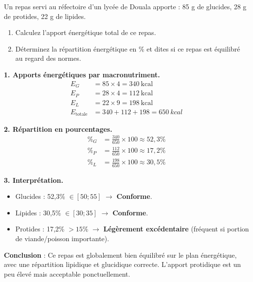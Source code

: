 \documentclass[11pt]{article}
\begin{document}
\begin{exoresolu}
Un repas servi au réfectoire d'un lycée de Douala apporte : 85 g de glucides, 28 g de protides, 22 g de lipides.
\begin{enumerate}
\item Calculez l'apport énergétique total de ce repas.
\item Déterminez la répartition énergétique en \% et dites si ce repas est équilibré au regard des normes.
\end{enumerate}
\tcblower
\textbf{1. Apports énergétiques par macronutriment.}
\begin{align*}
E_G &= 85 \times 4 = 340\ \mathrm{kcal} \\
E_P &= 28 \times 4 = 112\ \mathrm{kcal} \\
E_L &= 22 \times 9 = 198\ \mathrm{kcal} \\
E_{\text{totale}} &= 340 + 112 + 198 = \SI{650}{kcal}
\end{align*}

\textbf{2. Répartition en pourcentages.}
\begin{align*}
\%_G &= \frac{340}{650} \times 100 \approx 52,3\% \\
\%_P &= \frac{112}{650} \times 100 \approx 17,2\% \\
\%_L &= \frac{198}{650} \times 100 \approx 30,5\%
\end{align*}

\textbf{3. Interprétation.}
\begin{itemize}
\item Glucides : 52,3\% $\in [50; 55]$ $\rightarrow$ \textbf{Conforme}.
\item Lipides : 30,5\% $\in [30; 35]$ $\rightarrow$ \textbf{Conforme}.
\item Protides : 17,2\% $> 15\%$ $\rightarrow$ \textbf{Légèrement excédentaire} (fréquent si portion de viande/poisson importante).
\end{itemize}
\textbf{Conclusion} : Ce repas est globalement bien équilibré sur le plan énergétique, avec une répartition lipidique et glucidique correcte. L'apport protidique est un peu élevé mais acceptable ponctuellement.
\end{exoresolu}
\end{document}
